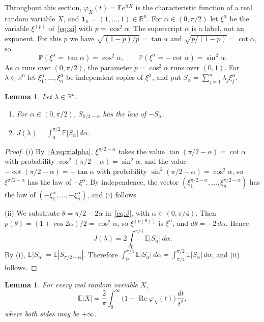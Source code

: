 \documentclass[11pt]{amsart}
\newtheorem{lemma}[theorem]{Lemma}
\theoremstyle{remark}
\numberwithin{equation}{section}
\newcommand{\R}{\mathbb{R}}
\newcommand{\E}{\mathbb{E}}
\renewcommand{\P}{\mathbb{P}}
\begin{document}
Throughout this section, $\varphi_X(t)=\E e^{itX}$ is the characteristic function of a real random variable $X$, and $\mathbf 1_n=(1,\dots,1)\in\R^n$. For $\alpha\in(0,\pi/2)$ let $\xi^\alpha$ be the variable $\xi^{(p)}$ of~\eqref{eq:xi} with $p=\cos^2\alpha$. The superscript $\alpha$ is a label, not an exponent. For this $p$ we have $\sqrt{(1-p)/p}=\tan\alpha$ and $\sqrt{p/(1-p)}=\cot\alpha$, so
\begin{equation}\label{A:eq:xialpha}
\P(\xi^\alpha=\tan\alpha)=\cos^2\alpha,\qquad \P(\xi^\alpha=-\cot\alpha)=\sin^2\alpha.
\end{equation}
As $\alpha$ runs over $(0,\pi/2)$, the parameter $p=\cos^2\alpha$ runs over $(0,1)$. For $\lambda\in\R^n$ let $\xi_1^\alpha,\dots,\xi_n^\alpha$ be independent copies of $\xi^\alpha$, and put $S_\alpha=\sum_{j=1}^n\lambda_j\xi_j^\alpha$.

\begin{lemma}\label{A:lem:angle}
Let $\lambda\in\R^n$.
\begin{enumerate}[label=(\roman*)]
\item For $\alpha\in(0,\pi/2)$, $S_{\pi/2-\alpha}$ has the law of $-S_\alpha$.
\item $J(\lambda)=\int_0^{\pi/2}\E|S_\alpha|\,d\alpha$.
\end{enumerate}
\end{lemma}

\begin{proof}
(i) By~\eqref{A:eq:xialpha}, $\xi^{\pi/2-\alpha}$ takes the value $\tan(\pi/2-\alpha)=\cot\alpha$ with probability $\cos^2(\pi/2-\alpha)=\sin^2\alpha$, and the value $-\cot(\pi/2-\alpha)=-\tan\alpha$ with probability $\sin^2(\pi/2-\alpha)=\cos^2\alpha$, so $\xi^{\pi/2-\alpha}$ has the law of $-\xi^\alpha$. By independence, the vector $(\xi_1^{\pi/2-\alpha},\dots,\xi_n^{\pi/2-\alpha})$ has the law of $(-\xi_1^\alpha,\dots,-\xi_n^\alpha)$, and (i) follows.

(ii) We substitute $\theta=\pi/2-2\alpha$ in~\eqref{eq:J}, with $\alpha\in(0,\pi/4)$. Then $p(\theta)=(1+\cos2\alpha)/2=\cos^2\alpha$, so $\xi^{(p(\theta))}$ is $\xi^\alpha$, and $d\theta=-2\,d\alpha$. Hence
\[
J(\lambda)=2\int_0^{\pi/4}\E|S_\alpha|\,d\alpha.
\]
By (i), $\E|S_\alpha|=\E|S_{\pi/2-\alpha}|$. Therefore $\int_0^{\pi/4}\E|S_\alpha|\,d\alpha=\int_{\pi/4}^{\pi/2}\E|S_\alpha|\,d\alpha$, and (ii) follows.
\end{proof}

\begin{lemma}\label{A:lem:fourier}
For every real random variable $X$,
\[
\E|X|=\frac2\pi\int_0^\infty\bigl(1-\operatorname{Re}\varphi_X(t)\bigr)\,\frac{dt}{t^2},
\]
where both sides may be $+\infty$.
\end{lemma}
\end{document}
